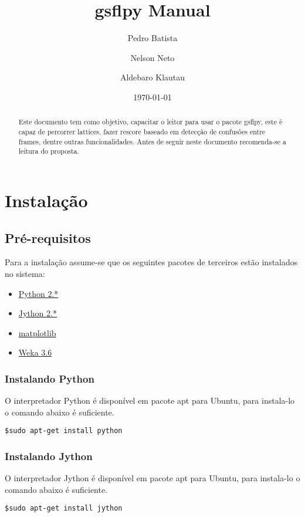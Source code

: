 \documentclass[a4paper]{article}
\author{Pedro Batista \and Nelson Neto \and Aldebaro Klautau}
\title{gsflpy Manual}
\begin{document}
\date{\today}

\maketitle

\begin{abstract}
Este documento tem como objetivo, capacitar o leitor para usar o pacote
gsflpy, este é capaz de percorrer lattices, fazer rescore baseado em 
detecção de confusões entre frames, dentre outras funcionalidades.
Antes de seguir neste documento recomenda-se a leitura do proposta.
\end{abstract}

\section{Instalação}
\subsection{Pré-requisitos}
Para a instalação assume-se que os seguintes pacotes de terceiros estão
instalados no sistema:
\begin{itemize}
   \item \href{http://python.org}{Python 2.*}
   \item \href{http://www.jython.org/}{Jython 2.*}
   \item \href{http://matplotlib.sourceforge.net/}{matplotlib}
   \item \href{http://www.cs.waikato.ac.nz/ml/weka/}{Weka 3.6}
\end{itemize}

\subsubsection{Instalando Python}
O interpretador Python é disponível em pacote apt para Ubuntu, para
instala-lo o comando abaixo é suficiente.
\begin{verbatim}
$sudo apt-get install python
\end{verbatim}

\subsubsection{Instalando Jython}
O interpretador Jython é disponível em pacote apt para Ubuntu, para
instala-lo o comando abaixo é suficiente.
\begin{verbatim}
$sudo apt-get install jython
\end{verbatim}
\end{document}
